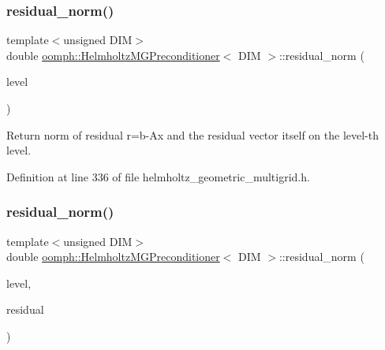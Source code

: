 \mbox{\label{classoomph_1_1HelmholtzMGPreconditioner_adc1a81bd9eee5b45e5c19cd6dd53d4d9}} 
\subsubsection{\texorpdfstring{residual\+\_\+norm()}{residual\_norm()}\hspace{0.1cm}{\footnotesize\ttfamily [1/2]}}
{\footnotesize\ttfamily template$<$unsigned D\+IM$>$ \\
double \hyperlink{classoomph_1_1HelmholtzMGPreconditioner}{oomph\+::\+Helmholtz\+M\+G\+Preconditioner}$<$ D\+IM $>$\+::residual\+\_\+norm (\begin{DoxyParamCaption}\item[{const unsigned \&}]{level }\end{DoxyParamCaption})\hspace{0.3cm}{\ttfamily [inline]}}



Return norm of residual r=b-\/\+Ax and the residual vector itself on the level-\/th level. 



Definition at line 336 of file helmholtz\+\_\+geometric\+\_\+multigrid.\+h.

\mbox{\label{classoomph_1_1HelmholtzMGPreconditioner_ab12e150cab2c6349bf3453d75261fca6}} 
\subsubsection{\texorpdfstring{residual\+\_\+norm()}{residual\_norm()}\hspace{0.1cm}{\footnotesize\ttfamily [2/2]}}
{\footnotesize\ttfamily template$<$unsigned D\+IM$>$ \\
double \hyperlink{classoomph_1_1HelmholtzMGPreconditioner}{oomph\+::\+Helmholtz\+M\+G\+Preconditioner}$<$ D\+IM $>$\+::residual\+\_\+norm (\begin{DoxyParamCaption}\item[{const unsigned \&}]{level,  }\item[{\hyperlink{classoomph_1_1Vector}{Vector}$<$ \hyperlink{classoomph_1_1DoubleVector}{Double\+Vector} $>$ \&}]{residual }\end{DoxyParamCaption})}



